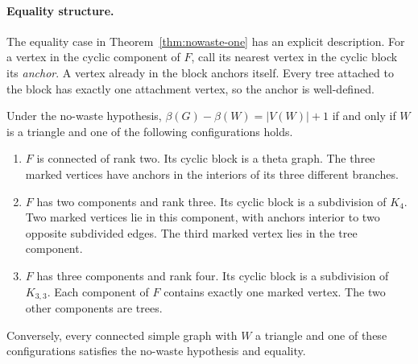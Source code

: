 \paragraph{Equality structure.}
The equality case in Theorem~\ref{thm:nowaste-one} has an explicit description.
For a vertex in the cyclic component of $F$, call its nearest vertex in the cyclic block its \emph{anchor}.
A vertex already in the block anchors itself.
Every tree attached to the block has exactly one attachment vertex, so the anchor is well-defined.

\begin{proposition}\label{prop:nowaste-equality}
Under the no-waste hypothesis,
$\beta(G)-\beta(W)=|V(W)|+1$ if and only if $W$ is a triangle and one of the following configurations holds.
\begin{enumerate}
\item $F$ is connected of rank two.
Its cyclic block is a theta graph.
The three marked vertices have anchors in the interiors of its three different branches.
\item $F$ has two components and rank three.
Its cyclic block is a subdivision of $K_4$.
Two marked vertices lie in this component, with anchors interior to two opposite subdivided edges.
The third marked vertex lies in the tree component.
\item $F$ has three components and rank four.
Its cyclic block is a subdivision of $K_{3,3}$.
Each component of $F$ contains exactly one marked vertex.
The two other components are trees.
\end{enumerate}
Conversely, every connected simple graph with $W$ a triangle and one of these configurations satisfies the no-waste hypothesis and equality.
\end{proposition}


